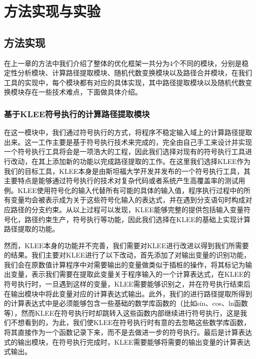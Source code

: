 \chapter{方法实现与实验}\label{chapter_experiment}

\section{方法实现}

在上一章的方法中我们介绍了整体的优化框架一共分为4个不同的模块，分别是稳定性分析模块、计算路径提取模块、随机代数变换模块以及路径合并模块，在我们工具的实现中，每个模块都有对应的具体实现，其中路径提取模块以及随机代数变换模块存在一些技术难点，下面做具体介绍。

\subsection{基于KLEE符号执行的计算路径提取模块}

在这一模块中，我们通过符号执行的方式，将程序不稳定输入域上的计算路径提取出来。这一工作主要是基于符号执行技术来完成的，完全由自己手工来设计并实现一个符号执行工具将会是一项浩大的工程，因此我们选择对现有的符号执行工具进行改动，在其上添加新的功能以完成路径提取的工作。在这里我们选择KLEE\cite{Cadar:2008:KUA:1855741.1855756}作为我们的目标工具，KLEE本身是由斯坦福大学开发并发布的一个符号执行工具，其主要特点是能够通过符号执行的技术对复杂代码或者系统产生高覆盖率的测试用例。KLEE使用符号化的输入代替所有可能的具体的输入值，程序执行过程中的所有变量均会被表示成为关于这些符号化输入的表达式，并在遇到分支语句时构成对应路径的分支约束。从以上过程可以发现，KLEE能够完整的提供包括输入变量符号化，路径约束生产，符号执行等功能，因此我们选择在KLEE的基础上实现计算路径提取的功能。

然而，KLEE本身的功能并不完善，我们需要对KLEE进行改进以得到我们所需要的结果。我们主要对KLEE进行了以下改动，首先添加了对输出变量的识别功能，我们会在原数值计算程序中对需要输出的变量做类似于插桩的操作，将其标记为输出变量，表示我们需要在提取此变量关于程序输入的一个计算表达式，在KLEE的符号执行时，一旦遇到这样的变量，KLEE需要能够识别之，并在符号执行结束后在输出模块中将此变量对应的计算表达式输出。此外，我们的进行路径提取所得到的计算表达式中是必须能够包含一些基础的数学库函数的（比如sin、cos、ln函数等），然而KLEE在符号执行时却跳转入这些函数内部继续进行符号执行，这是我们不想看到的，为此，我们使KLEE在符号执行时有意的去忽略这些数学库函数，将其直接作为一个函数记录下来，而不是去做进一步的符号执行。最后是计算表达式的输出模块，在符号执行完成时，KLEE需要能够将需要的输出变量的计算表达式输出。

